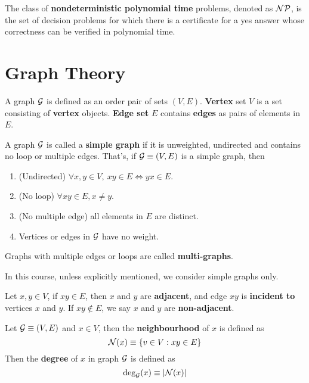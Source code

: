 \documentclass{article}
\begin{document}
			\begin{definition}
				The class of \textbf{nondeterministic polynomial time} problems, denoted as $\mathcal{{NP}}$, is the set of decision problems for which there is a certificate for a yes answer whose correctness can be verified in polynomial time.
			\end{definition}
	
	\section{Graph Theory}
		\begin{definition}
			A graph $\mathcal{{G}}$ is defined as an order pair of sets $(V, E)$. \textbf{Vertex} set $V$ is a set consisting of \textbf{vertex} objects. \textbf{Edge set} $E$ contains \textbf{edges} as pairs of elements in $E$.
		\end{definition}
		
		\begin{definition}
			A graph $\mathcal{{G}}$ is called a \textbf{simple graph} if it is unweighted, undirected and contains no loop or multiple edges. That's, if $\mathcal{{G}} \equiv (V, E)$ is a simple graph, then
			\begin{enumerate}
				\item (Undirected) $\forall x, y \in V,\ xy \in E \iff yx \in E$.
				\item (No loop) $\forall xy \in E, x \neq y$.
				\item (No multiple edge) all elements in $E$ are distinct.
				\item Vertices or edges in $\mathcal{{G}}$ have no weight.
			\end{enumerate}
			Graphs with multiple edges or loops are called \textbf{multi-graphs}.
		\end{definition}
		
		\begin{remark}
			In this course, unless explicitly mentioned, we consider simple graphs only.
		\end{remark}
		
		\begin{definition}
			Let $x, y \in V$, if $xy \in E$, then $x$ and $y$ are \textbf{adjacent}, and edge $xy$ is \textbf{incident to} vertices $x$ and $y$. If $xy \notin E$, we say $x$ and $y$ are \textbf{non-adjacent}.
		\end{definition}
		
		\begin{definition}
			Let $\mathcal{{G}} \equiv (V, E)$ and $x \in V$, then the \textbf{neighbourhood} of $x$ is defined as
			\begin{equation}
				\mathcal{{N}}(x) \equiv \{v \in V: xy \in E\}
			\end{equation}
			Then the \textbf{degree} of $x$ in graph $\mathcal{{G}}$ is defined as
			\begin{equation}
				\text{{deg}}_{\mathcal{{G}}}(x) \equiv |\mathcal{{N}}(x)|
			\end{equation}
		\end{definition}
		
\end{document}
